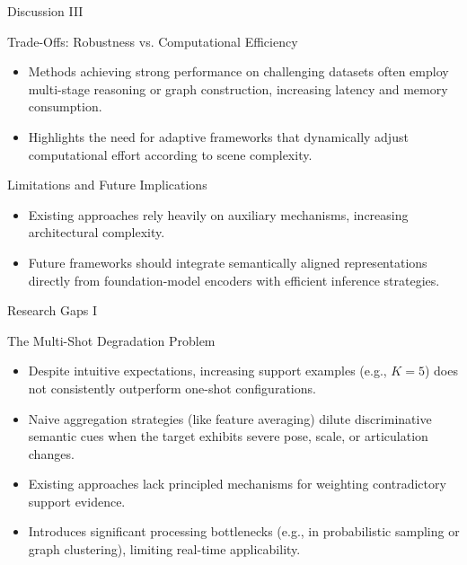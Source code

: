 \documentclass[aspectratio=169, 10pt]{beamer}
\begin{document}
\begin{frame}{Discussion III}
    \begin{block}{Trade-Offs: Robustness vs. Computational Efficiency}
        \footnotesize
        \begin{itemize}
            \item Methods achieving strong performance on challenging datasets often employ multi-stage reasoning or graph construction, increasing latency and memory consumption.
            \item Highlights the need for adaptive frameworks that dynamically adjust computational effort according to scene complexity.
        \end{itemize}
    \end{block}

    \begin{block}{Limitations and Future Implications}
        \footnotesize
        \begin{itemize}
            \item Existing approaches rely heavily on auxiliary mechanisms, increasing architectural complexity.
            \item Future frameworks should integrate semantically aligned representations directly from foundation-model encoders with efficient inference strategies.
        \end{itemize}
    \end{block}
\end{frame}




\begin{frame}{Research Gaps I}
    \begin{alertblock}{The Multi-Shot Degradation Problem}
        \footnotesize
        \begin{itemize}
            \item Despite intuitive expectations, increasing support examples (e.g., $K=5$) does not consistently outperform one-shot configurations.
            \item Naive aggregation strategies (like feature averaging) dilute discriminative semantic cues when the target exhibits severe pose, scale, or articulation changes.
            \item Existing approaches lack principled mechanisms for weighting contradictory support evidence.
            \item Introduces significant processing bottlenecks (e.g., in probabilistic sampling or graph clustering), limiting real-time applicability.
        \end{itemize}
    \end{alertblock}
\end{frame}
\end{document}
